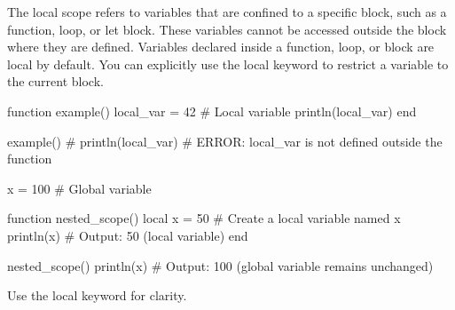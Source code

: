 \documentclass{report}
\begin{document}
    \bigbreak \noindent 
    The local scope refers to variables that are confined to a specific block, such as a function, loop, or let block. These variables cannot be accessed outside the block where they are defined.
    \bigbreak \noindent 
    Variables declared inside a function, loop, or block are local by default. You can explicitly use the local keyword to restrict a variable to the current block.
    \bigbreak \noindent 
    \begin{jlcode}
        function example()
            local_var = 42  # Local variable
            println(local_var)
        end

        example()
        # println(local_var)  # ERROR: local_var is not defined outside the function
    \end{jlcode}
    \bigbreak \noindent 
    \begin{jlcode}
        x = 100  # Global variable

        function nested_scope()
        local x = 50  # Create a local variable named x
        println(x)    # Output: 50 (local variable)
        end

        nested_scope()
        println(x)        # Output: 100 (global variable remains unchanged)
    \end{jlcode}
    \bigbreak \noindent 
    Use the local keyword for clarity.

    \bigbreak \noindent 
\end{document}

